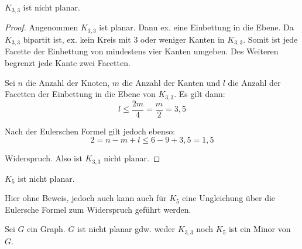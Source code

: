 \begin{lemma}
    \label{lem:k33-planar}
    $ K_{3,3} $ ist nicht planar.
\end{lemma}

\begin{proof}
    Angenommen $ K_{3,3} $ ist planar.
    Dann ex. eine Einbettung in die Ebene.
    Da $ K_{3,3} $ bipartit ist, ex. kein Kreis mit 3 oder weniger Kanten in $ K_{3,3} $.
    Somit ist jede Facette der Einbettung von mindestens vier Kanten umgeben.
    Des Weiteren begrenzt jede Kante zwei Facetten.

    Sei $ n $ die Anzahl der Knoten, $ m $ die Anzahl der Kanten und $ l $ die Anzahl der Facetten der Einbettung in die Ebene von $ K_{3,3} $.
    Es gilt dann:
    \begin{equation*}
        l \leq \frac{2m}{4} = \frac{m}{2} = 3,5
    \end{equation*}

    Nach der Eulerschen Formel gilt jedoch ebenso:
    \begin{equation*}
        2 = n - m + l \leq 6 - 9 + 3,5 = 1,5
    \end{equation*}

    Widerspruch.
    Also ist $ K_{3,3} $ nicht planar.
\end{proof}

\begin{lemma}
    \label{lem:k5-planar}
    $ K_5 $ ist nicht planar.
\end{lemma}

\begin{remark}
    Hier ohne Beweis, jedoch auch kann auch für $ K_5 $ eine Ungleichung über die Eulersche Formel zum Widerspruch geführt werden.
\end{remark}

\begin{theorem}
    Sei $ G $ ein Graph.
    $ G $ ist nicht planar gdw. weder $ K_{3,3} $ noch $ K_5 $ ist ein Minor von $ G $.
\end{theorem}

